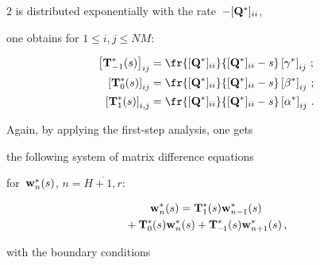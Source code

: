 \begin{multicols}{2}
is distributed exponentially with the rate~$-[\mathbf{Q}^{*}]_{ii}$, 


one obtains for $1 \le i,j \le NM$:


\begin{align*}


\left[ \bmx{T}^{*}_{-1}(s) \right]_{ij}


&=


\fr{[\bmx{Q}^{*}]_{ii}}{[\bmx{Q}^{*}]_{ii} - s}


\left[\gamma^{*}\right]_{ij}\,;


\\


\left[ \bmx{T}^{*}_0(s) \right]_{ij}


&=\fr{[\bmx{Q}^{*}]_{ii}}{[\bmx{Q}^{*}]_{ii} - s}


\left[\beta^{*}\right]_{ij}  \,;


\\


\left[ \bmx{T}^{*}_1(s) \right]_{i,j}


&=


\fr{[\bmx{Q}^{*}]_{ii} }{[\bmx{Q}^{*}]_{ii} - s}


\left[\alpha^{*}\right]_{ij}   \,.


\end{align*}





Again, by applying the first-step analysis, one gets 


the following system of matrix difference equations 


for~$\mathbf{w}^*_n(s)$, $n=\overline{H+1,r}$:


\begin{multline}


\label{w*n}


\bmx{w}^*_n(s)


= \bmx{T}^*_1(s)  \bmx{w}^*_{n-1}(s)\\


{} +  \bmx{T}^*_0(s) \bmx{w}^*_n(s) + 


\bmx{T}^*_{-\!1}(s)  \bmx{w}^*_{n+1}(s)\,,


\end{multline}





\noindent with the boundary conditions


\begin{equation}


\label{w*nbound}



\end{equation}
\end{multicols}
